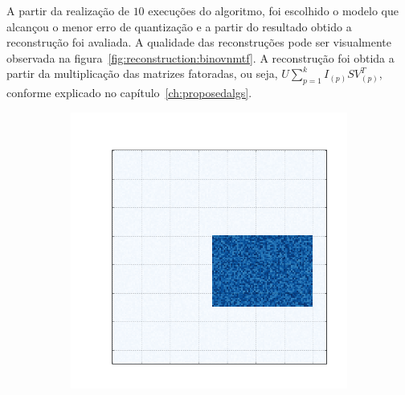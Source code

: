 \documentclass[
    12pt,                %
    oneside,            %
    a4paper,            %
    english,            %
    brazil                %
    ]{abntex2ppgsi}
\begin{document}
A partir da realização de $10$ execuções do algoritmo, foi escolhido o modelo que alcançou o menor erro de quantização e a partir do resultado obtido a reconstrução foi avaliada. A qualidade das reconstruções pode ser visualmente observada na figura~\ref{fig:reconstruction:binovnmtf}. A reconstrução foi obtida a partir da multiplicação das matrizes fatoradas, ou seja, $U \sum_{p=1}^{k} I_{(p)} S V_{(p)}^T$, conforme explicado no capítulo~\ref{ch:proposedalgs}.

\begin{figure}[H]
\centering
    \caption{
        As primeiras cinco matrizes são as matrizes originais, as demais são suas respectivas reconstruções, realizadas a partir dos resultados obtidos com o algoritmo \textit{BinOvNMTF}.
    }
    \begin{subfigure}[b]{0.18\textwidth}
        \includegraphics[width=\textwidth]{img/a-bic-structure.png}
    \end{subfigure}
    \begin{subfigure}[b]{0.18\textwidth}

\end{subfigure}
\end{figure}
\end{document}
